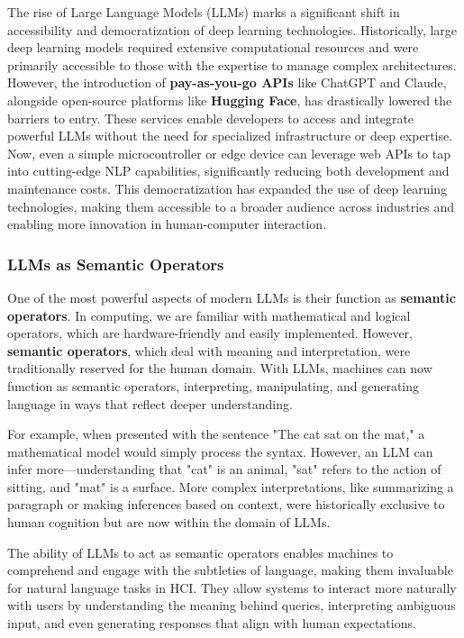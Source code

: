The rise of Large Language Models (LLMs) marks a significant shift in accessibility and democratization of deep learning technologies.
Historically, large deep learning models required extensive computational resources and were primarily accessible to those with the expertise to manage complex architectures.
However, the introduction of \textbf{pay-as-you-go APIs} like ChatGPT and Claude, alongside open-source platforms like \textbf{Hugging Face}, has drastically lowered the barriers to entry.
These services enable developers to access and integrate powerful LLMs without the need for specialized infrastructure or deep expertise.
Now, even a simple microcontroller or edge device can leverage web APIs to tap into cutting-edge NLP capabilities, significantly reducing both development and maintenance costs.
This democratization has expanded the use of deep learning technologies, making them accessible to a broader audience across industries and enabling more innovation in human-computer interaction.

\subsubsection{ LLMs as Semantic Operators}

One of the most powerful aspects of modern LLMs is their function as \textbf{semantic operators}.
In computing, we are familiar with mathematical and logical operators, which are hardware-friendly and easily implemented.
However, \textbf{semantic operators}, which deal with meaning and interpretation, were traditionally reserved for the human domain.
With LLMs, machines can now function as semantic operators, interpreting, manipulating, and generating language in ways that reflect deeper understanding.

For example, when presented with the sentence "The cat sat on the mat," a mathematical model would simply process the syntax.
However, an LLM can infer more—understanding that "cat" is an animal, "sat" refers to the action of sitting, and "mat" is a surface.
More complex interpretations, like summarizing a paragraph or making inferences based on context, were historically exclusive to human cognition but are now within the domain of LLMs.

The ability of LLMs to act as semantic operators enables machines to comprehend and engage with the subtleties of language, making them invaluable for natural language tasks in HCI.
They allow systems to interact more naturally with users by understanding the meaning behind queries, interpreting ambiguous input, and even generating responses that align with human expectations.

